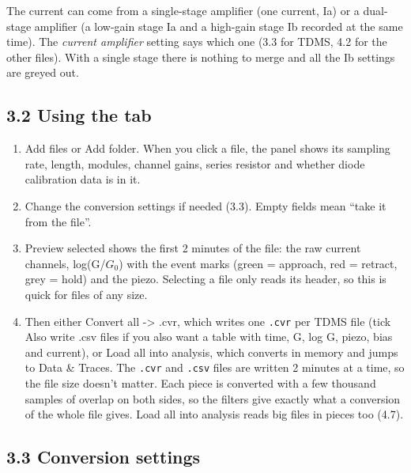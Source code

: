 \documentclass[
  11pt,
  a4paper,
]{article}
\providecommand{\tightlist}{%
  \setlength{\itemsep}{0pt}\setlength{\parskip}{0pt}}
\begin{document}
The current can come from a single-stage amplifier (one current, Ia) or
a dual-stage amplifier (a low-gain stage Ia and a high-gain stage Ib
recorded at the same time). The \emph{current amplifier} setting says
which one (3.3 for TDMS, 4.2 for the other files). With a single stage
there is nothing to merge and all the Ib settings are greyed out.

\hypertarget{using-the-tab}{%
\subsection{3.2 Using the tab}\label{using-the-tab}}

\begin{enumerate}
\def\labelenumi{\arabic{enumi}.}
\tightlist
\item
  Add files or Add folder. When you click a file, the panel shows its
  sampling rate, length, modules, channel gains, series resistor and
  whether diode calibration data is in it.
\item
  Change the conversion settings if needed (3.3). Empty fields mean
  ``take it from the file''.
\item
  Preview selected shows the first 2 minutes of the file: the raw
  current channels, log(G/$G_0$) with the event marks (green = approach,
  red = retract, grey = hold) and the piezo. Selecting a file only reads
  its header, so this is quick for files of any size.
\item
  Then either Convert all -\textgreater{} .cvr, which writes one
  \texttt{.cvr} per TDMS file (tick Also write .csv files if you also
  want a table with time, G, log G, piezo, bias and current), or Load
  all into analysis, which converts in memory and jumps to Data \&
  Traces. The \texttt{.cvr} and \texttt{.csv} files are written 2
  minutes at a time, so the file size doesn't matter. Each piece is
  converted with a few thousand samples of overlap on both sides, so the
  filters give exactly what a conversion of the whole file gives. Load
  all into analysis reads big files in pieces too (4.7).
\end{enumerate}

\hypertarget{conversion-settings}{%
\subsection{3.3 Conversion settings}\label{conversion-settings}}
\end{document}
